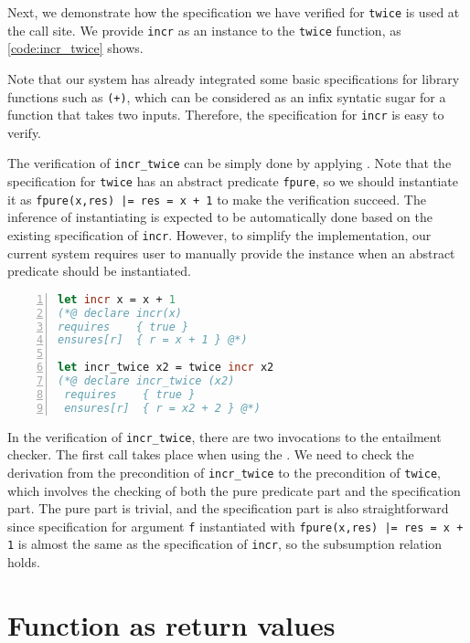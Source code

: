Next, we demonstrate how the specification we have verified for \texttt{twice} is used at the call site. We provide \texttt{incr} as an instance to the \texttt{twice} function, as \autoref{code:incr_twice} shows. 

Note that our system has already integrated some basic specifications for library functions such as \texttt{(+)}, which can be considered as an infix syntatic sugar for a function that takes two inputs. Therefore, the specification for \texttt{incr} is easy to verify.

The verification of \texttt{incr\_twice} can be simply done by applying . Note that the specification for \texttt{twice} has an abstract predicate \texttt{fpure}, so we should instantiate it as \texttt{fpure(x,res) |= res = x + 1} to make the verification succeed. The inference of instantiating is expected to be automatically done based on the existing specification of \texttt{incr}. However, to simplify the implementation, our current system requires user to manually provide the instance when an abstract predicate should be instantiated.

\begin{lstlisting}[language=Caml, mathescape=true, xleftmargin=2em, aboveskip=1em, xrightmargin=1em, numbers=left, frame = {TB}, caption=Higher order twice function application, label=code:incr_twice]
let incr x = x + 1
(*@ declare incr(x)
requires    { true }
ensures[r]  { r = x + 1 } @*)

let incr_twice x2 = twice incr x2
(*@ declare incr_twice (x2)
 requires    { true }
 ensures[r]  { r = x2 + 2 } @*)
\end{lstlisting}

In the verification of \texttt{incr\_twice}, there are two invocations to the entailment checker. The first call takes place when using the . We need to check the derivation from the precondition of \texttt{incr\_twice} to the precondition of \texttt{twice}, which involves the checking of both the pure predicate part and the specification part. The pure part is trivial, and the specification part is also straightforward since specification for argument \texttt{f} instantiated with \texttt{fpure(x,res) |= res = x + 1} is almost the same as the specification of \texttt{incr}, so the subsumption relation holds.


\section{Function as return values}

